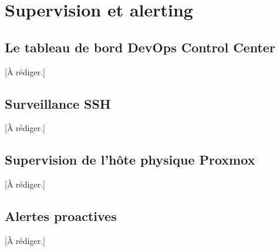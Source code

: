 \chapter{Supervision et alerting}
\label{chap:supervision}

\section{Le tableau de bord DevOps Control Center}
[À rédiger.]

\section{Surveillance SSH}
[À rédiger.]

\section{Supervision de l'hôte physique Proxmox}
[À rédiger.]

\section{Alertes proactives}
[À rédiger.]

\clearpage
